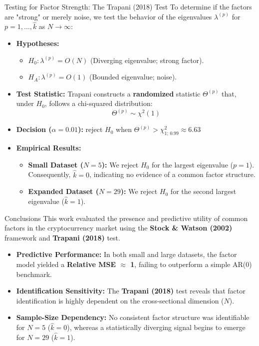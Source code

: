 \documentclass{beamer}
\begin{document}
   \begin{frame}{Testing for Factor Strength: The Trapani (2018) Test}
    To determine if the factors are "strong" or merely noise, we test the behavior of the eigenvalues $\lambda^{(p)}$ for $p=1, \dots, \hat{k}$ as $N \to \infty$:
    
    \begin{itemize}
        \item \textbf{Hypotheses:}
        \begin{itemize}
            \item $H_0: \lambda^{(p)} = O(N)$ (Diverging eigenvalue; strong factor).
            \item $H_A: \lambda^{(p)} = O(1)$ (Bounded eigenvalue; noise).
        \end{itemize}
        
        \item \textbf{Test Statistic:} Trapani constructs a \textbf{randomized} statistic $\Theta^{(p)}$ that, under $H_0$, follows a chi-squared distribution:
        \begin{equation*}
            \Theta^{(p)} \sim \chi^2(1)
        \end{equation*}
        
        \item \textbf{Decision ($\alpha = 0.01$):} reject $H_0$ when
              $\Theta^{(p)} > \chi^2_{1;\,0.99} \approx 6.63$        
        \item \textbf{Empirical Results:}
        \begin{itemize}
            \item \textbf{Small Dataset ($N=5$):} We reject $H_0$ for the largest eigenvalue ($p=1$). Consequently, $\hat{k}=0$, indicating no evidence of a common factor structure.
            \item \textbf{Expanded Dataset ($N=29$):} We reject $H_0$ for the second largest eigenvalue ($\hat{k}=1$).
        \end{itemize}
    \end{itemize}
\end{frame}    
\begin{frame}{Conclusions}
    This work evaluated the presence and predictive utility of common factors in the cryptocurrency market using the \textbf{Stock \& Watson (2002)} framework and \textbf{Trapani (2018)} test.
    
    \begin{itemize}
        \item \textbf{Predictive Performance:} In both small and large datasets, the factor model yielded a \textbf{Relative MSE $\approx$ 1}, failing to outperform a simple AR(0) benchmark.
        \item \textbf{Identification Sensitivity:} The \textbf{Trapani (2018)} test reveals that factor identification is highly dependent on the cross-sectional dimension ($N$).
        \item \textbf{Sample-Size Dependency:} No consistent factor structure was identifiable for $N=5$ ($\hat{k}=0$), whereas a statistically diverging signal begins to emerge for $N=29$ ($\hat{k}=1$). 
        \end{itemize}
\end{frame}
    
\end{document}
